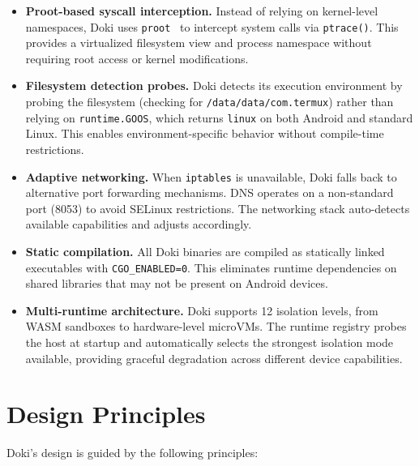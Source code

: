 \begin{itemize}[leftmargin=*, itemsep=4pt]
  \item \textbf{Proot-based syscall interception.} Instead of relying
        on kernel-level namespaces, Doki uses
        \texttt{proot}~\cite{proot2024} to intercept system calls via
        \texttt{ptrace()}. This provides a virtualized filesystem view
        and process namespace without requiring root access or kernel
        modifications.

  \item \textbf{Filesystem detection probes.} Doki detects its
        execution environment by probing the filesystem (checking for
        \texttt{/data/data/com.termux}) rather than relying on
        \texttt{runtime.GOOS}, which returns \texttt{linux} on both
        Android and standard Linux. This enables environment-specific
        behavior without compile-time restrictions.

  \item \textbf{Adaptive networking.} When \texttt{iptables} is
        unavailable, Doki falls back to alternative port forwarding
        mechanisms. DNS operates on a non-standard port (8053) to
        avoid SELinux restrictions. The networking stack auto-detects
        available capabilities and adjusts accordingly.

  \item \textbf{Static compilation.} All Doki binaries are compiled
        as statically linked executables with \texttt{CGO\_ENABLED=0}.
        This eliminates runtime dependencies on shared libraries that
        may not be present on Android devices.

  \item \textbf{Multi-runtime architecture.} Doki supports 12
        isolation levels, from WASM sandboxes to hardware-level
        microVMs. The runtime registry probes the host at startup and
        automatically selects the strongest isolation mode available,
        providing graceful degradation across different device
        capabilities.
\end{itemize}

\section{Design Principles}
\label{sec:principles}

Doki's design is guided by the following principles:

